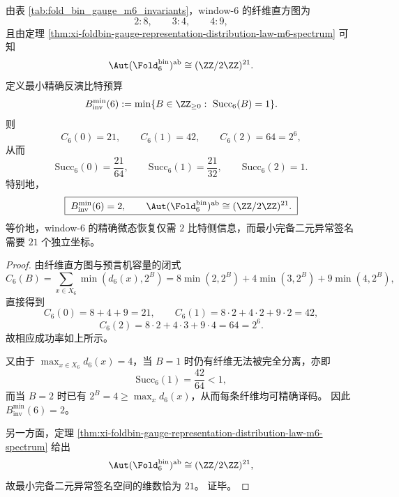\begin{proposition}\label{prop:xi-window6-two-bit-recovery-vs-21bit-signature}
由表 \ref{tab:fold_bin_gauge_m6_invariants}，window-\(6\) 的纤维直方图为
\[
2:8,\qquad 3:4,\qquad 4:9,
\]
且由定理 \ref{thm:xi-foldbin-gauge-representation-distribution-law-m6-spectrum} 可知
\[
\Aut(\Fold_6^{\mathrm{bin}})^{\mathrm{ab}}\cong (\ZZ/2\ZZ)^{21}.
\]
定义最小精确反演比特预算
\[
B_{\mathrm{inv}}^{\min}(6):=\min\{B\in\ZZ_{\ge 0}:\ \mathrm{Succ}_6(B)=1\}.
\]
则
\[
C_6(0)=21,\qquad
C_6(1)=42,\qquad
C_6(2)=64=2^6,
\]
从而
\[
\mathrm{Succ}_6(0)=\frac{21}{64},\qquad
\mathrm{Succ}_6(1)=\frac{21}{32},\qquad
\mathrm{Succ}_6(2)=1.
\]
特别地，
\[
\boxed{\;
B_{\mathrm{inv}}^{\min}(6)=2,\qquad
\Aut(\Fold_6^{\mathrm{bin}})^{\mathrm{ab}}\cong (\ZZ/2\ZZ)^{21}.\;}
\]
等价地，window-\(6\) 的精确微态恢复仅需 \(2\) 比特侧信息，而最小完备二元异常签名需要 \(21\) 个独立坐标。
\end{proposition}
\begin{proof}
由纤维直方图与预言机容量的闭式
\[
C_6(B)=\sum_{x\in X_6}\min(d_6(x),2^B)
=8\min(2,2^B)+4\min(3,2^B)+9\min(4,2^B),
\]
直接得到
\[
C_6(0)=8+4+9=21,
\qquad
C_6(1)=8\cdot 2+4\cdot 2+9\cdot 2=42,
\]
\[
C_6(2)=8\cdot 2+4\cdot 3+9\cdot 4=64=2^6.
\]
故相应成功率如上所示。

又由于 \(\max_{x\in X_6}d_6(x)=4\)，当 \(B=1\) 时仍有纤维无法被完全分离，亦即
\[
\mathrm{Succ}_6(1)=\frac{42}{64}<1,
\]
而当 \(B=2\) 时已有 \(2^B=4\ge \max_x d_6(x)\)，从而每条纤维均可精确译码。
因此 \(B_{\mathrm{inv}}^{\min}(6)=2\)。

另一方面，定理 \ref{thm:xi-foldbin-gauge-representation-distribution-law-m6-spectrum} 给出
\[
\Aut(\Fold_6^{\mathrm{bin}})^{\mathrm{ab}}\cong (\ZZ/2\ZZ)^{21},
\]
故最小完备二元异常签名空间的维数恰为 \(21\)。
证毕。
\end{proof}

